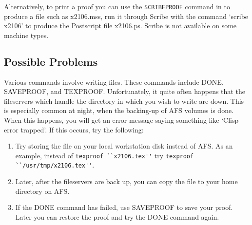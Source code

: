 \documentclass{article}
\begin{document}
Alternatively, to print a proof
you can use the {\tt SCRIBEPROOF} command in {\ETPS} to produce a file
such as x2106.mss, run it through Scribe with the command `scribe x2106' to produce
the Postscript file x2106.ps. Scribe is not available on some machine types.

\subsection{Possible Problems}

Various {\ETPS} commands involve writing files.  These commands include
DONE, SAVEPROOF, and TEXPROOF.  Unfortunately, it quite often
happens that the fileservers which handle the directory in which you
wish to write are down.  This is especially common at night, when
the backing-up of AFS volumes is done.  When this happens, you will get
an error message saying something like `Clisp error trapped'.  If this occurs,
try the following:

\begin{enumerate}
\item Try storing the file on your local workstation disk instead of AFS.
As an example, instead of \newline
\verb=texproof ``x2106.tex''= \newline
try \newline
\verb=texproof ``/usr/tmp/x2106.tex''=.

\item Later, after the
fileservers are back up, you can copy the file to your home directory on AFS.

\item If the DONE command has failed, use SAVEPROOF to save your proof.
Later you can restore the proof and try the DONE command again.
\end{enumerate}
\end{document}
